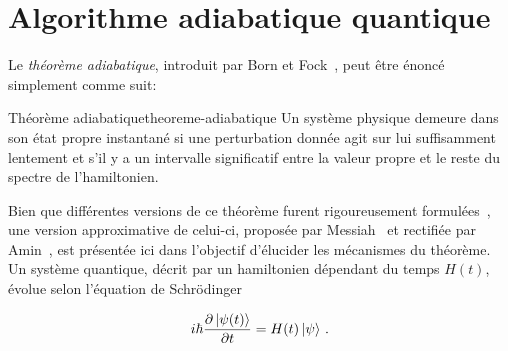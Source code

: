 

\section{Algorithme adiabatique quantique}
\label{sec:algorithme-adiabatique-quantique}

Le \textit{théorème adiabatique}, introduit par Born et Fock~\cite{bornBeweisAdiabatensatzes1928}, peut être énoncé simplement comme suit:

\begin{subtheorem}{Théorème adiabatique}{theoreme-adiabatique}
    Un système physique demeure dans son état propre instantané si une perturbation donnée agit sur lui suffisamment lentement et s'il y a un intervalle significatif entre la valeur propre et le reste du spectre de l'hamiltonien.
\end{subtheorem}

Bien que différentes versions de ce théorème furent rigoureusement formulées~\cite{albashAdiabaticQuantumComputing2018}, une version approximative de celui-ci, proposée par Messiah~\cite{messiahQuantumMechanics1999} et rectifiée par Amin~\cite{aminConsistencyAdiabaticTheorem2009}, est présentée ici dans l'objectif d'élucider les mécanismes du théorème. Un système quantique, décrit par un hamiltonien dépendant du temps $H(t)$, évolue selon l'équation de Schrödinger


\begin{align*}
   i \hbar \frac{\partial \ket{\psi(t)}}{\partial t} = H(t) \ket{\psi} \,.
\end{align*}

